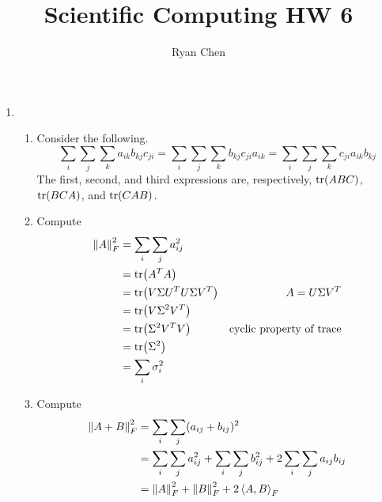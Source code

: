 \documentclass{article}
\title{Scientific Computing HW 6}
\author{Ryan Chen}
\newcommand{\lbr}[1]{\left\langle#1\right\rangle}
\renewcommand{\S}{\Sigma}
\newcommand{\s}{\sigma}
\renewcommand{\ip}[2]{\lbr{#1,#2}}
\begin{document}
	
\maketitle



\begin{enumerate}
	
	
	
	\item 
	
	\begin{enumerate}
		
		
		
		\item Consider the following.
		\[\sum_i\sum_j\sum_k a_{ik}b_{kj}c_{ji} = \sum_i\sum_j\sum_k b_{kj}c_{ji}a_{ik} = \sum_i\sum_j\sum_k c_{ji}a_{ik}b_{kj}\]
		The first, second, and third expressions are, respectively, $\tr(ABC)$, $\tr(BCA)$, and $\tr(CAB)$.
		
		
		
		\item Compute
		\begin{align*}
			\norm{A}_F^2 &= \sum_i\sum_j a_{ij}^2 \\
			&= \tr(A^TA) \\
			&= \tr(V\S U^TU\S V^T) & A = U\S V^T \\
			&= \tr(V\S^2V^T) \\
			&= \tr(\S^2V^TV) & \text{cyclic property of trace} \\
			&= \tr(\S^2) \\
			&= \sum_i \s_i^2
		\end{align*}
		
		
		
		\item Compute
		\begin{align*}
			\norm{A+B}_F^2 &= \sum_i\sum_j (a_{ij}+b_{ij})^2 \\
			&= \sum_i\sum_j a_{ij}^2 + \sum_i\sum_j b_{ij}^2 + 2\sum_i\sum_j a_{ij}b_{ij} \\
			&= \norm{A}_F^2 + \norm{B}_F^2 + 2\ip{A}{B}_F
		\end{align*}
		
		
		
	\end{enumerate}



	\pagebreak
	
	
	

\end{enumerate}
\end{document}
